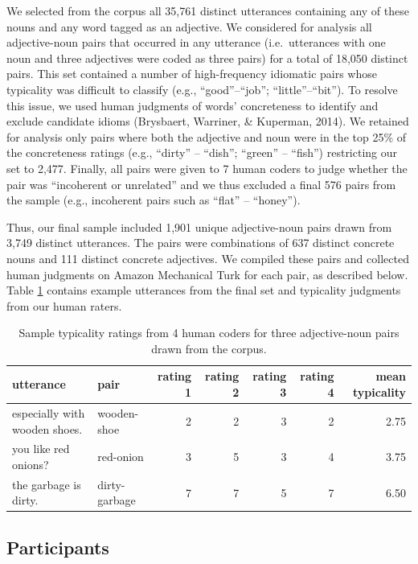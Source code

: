 \documentclass[10pt, letterpaper]{article}
\begin{document}
We selected from the corpus all 35,761 distinct utterances containing
any of these nouns and any word tagged as an adjective. We considered
for analysis all adjective-noun pairs that occurred in any utterance
(i.e.~utterances with one noun and three adjectives were coded as three
pairs) for a total of 18,050 distinct pairs. This set contained a number
of high-frequency idiomatic pairs whose typicality was difficult to
classify (e.g., ``good''--``job''; ``little''--``bit''). To resolve this
issue, we used human judgments of words' concreteness to identify and
exclude candidate idioms (Brysbaert, Warriner, \& Kuperman, 2014). We
retained for analysis only pairs where both the adjective and noun were
in the top 25\% of the concreteness ratings (e.g., ``dirty'' --
``dish''; ``green'' -- ``fish'') restricting our set to 2,477. Finally,
all pairs were given to 7 human coders to judge whether the pair was
``incoherent or unrelated'' and we thus excluded a final 576 pairs from
the sample (e.g., incoherent pairs such as ``flat'' -- ``honey'').

Thus, our final sample included 1,901 unique adjective-noun pairs drawn
from 3,749 distinct utterances. The pairs were combinations of 637
distinct concrete nouns and 111 distinct concrete adjectives. We
compiled these pairs and collected human judgments on Amazon Mechanical
Turk for each pair, as described below. Table \ref{tab:utt_table}
contains example utterances from the final set and typicality judgments
from our human raters.

\begin{table}[tb]
\centering
\begin{tabular}{llrrrrr}
  \hline
utterance & pair & rating 1 & rating 2 & rating 3 & rating 4 & mean typicality \\ 
  \hline
especially with wooden shoes. & wooden-shoe &   2 &   2 &   3 &   2 & 2.75 \\ 
  you like red onions? & red-onion &   3 &   5 &   3 &   4 & 3.75 \\ 
  the garbage is dirty. & dirty-garbage &   7 &   7 &   5 &   7 & 6.50 \\ 
   \hline
\end{tabular}
\caption{Sample typicality ratings from 4 human coders for three adjective-noun pairs drawn from the corpus.} 
\label{tab:utt_table}
\end{table}

\hypertarget{participants}{%
\subsection{Participants}\label{participants}}
\end{document}

